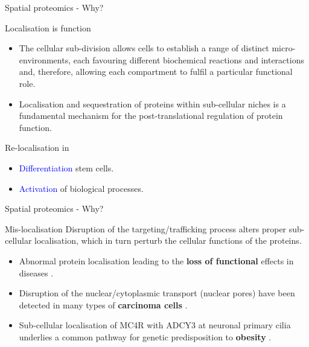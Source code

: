 
\begin{frame}{Spatial proteomics - Why?}
  \begin{block}{Localisation is function}
    \begin{itemize}
    \item The cellular sub-division allows cells to establish a range
      of distinct micro-environments, each favouring different
      biochemical reactions and interactions and, therefore, allowing
      each compartment to fulfil a particular functional role.
    \item Localisation and sequestration of proteins within
      sub-cellular niches is a fundamental mechanism for the
      post-translational regulation of protein function.
    \end{itemize}
  \end{block}
  \begin{block}{Re-localisation in}
    \begin{itemize}
    \item \textcolor{Blue}{Differentiation} stem cells.
    \item \textcolor{Blue}{Activation} of biological processes.
    \end{itemize}
  \end{block}
\end{frame}

\begin{frame}{Spatial proteomics - Why?}
  \begin{block}{Mis-localisation}
    Disruption of the targeting/trafficking process alters proper
    sub-cellular localisation, which in turn perturb the cellular
    functions of the proteins.
    \begin{itemize}
    \item Abnormal protein localisation leading to the \textbf{loss of
        functional} effects in diseases \citep{Laurila2009}.
    \item Disruption of the nuclear/cytoplasmic transport (nuclear
      pores) have been detected in many types of \textbf{carcinoma
        cells} \citep{Kau2004}.
    \item Sub-cellular localisation of MC4R with ADCY3 at neuronal
      primary cilia underlies a common pathway for genetic
      predisposition to \textbf{obesity} \citep{Siljee:2018}.
    \end{itemize}
  \end{block}

\end{frame}


